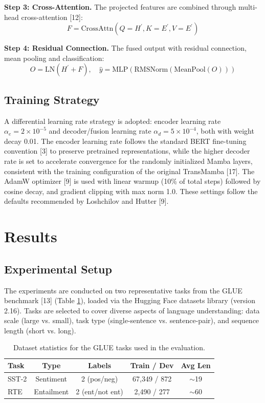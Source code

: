 \documentclass[runningheads]{llncs}
\begin{document}
\noindent\textbf{Step 3: Cross-Attention.} The projected features are combined through multi-head cross-attention [12]:
\begin{equation}
F = \text{CrossAttn}(Q = H^{\prime}, K = E^{\prime}, V = E^{\prime})
\end{equation}

\noindent\textbf{Step 4: Residual Connection.} The fused output with residual connection, mean pooling and classification:
\begin{equation}
O=\text{LN}(H^{\prime}+F), \quad \hat{y}=\text{MLP}(\text{RMSNorm}(\text{MeanPool}(O)))
\end{equation}

\subsection{Training Strategy}
A differential learning rate strategy is adopted: encoder learning rate $\alpha_{e}=2\times10^{-5}$ and decoder/fusion learning rate $\alpha_{d}=5\times10^{-4}$, both with weight decay 0.01. The encoder learning rate follows the standard BERT fine-tuning convention [3] to preserve pretrained representations, while the higher decoder rate is set to accelerate convergence for the randomly initialized Mamba layers, consistent with the training configuration of the original TransMamba [17]. The AdamW optimizer [9] is used with linear warmup (10\% of total steps) followed by cosine decay, and gradient clipping with max norm 1.0. These settings follow the defaults recommended by Loshchilov and Hutter [9].

\section{Results}

\subsection{Experimental Setup}
The experiments are conducted on two representative tasks from the GLUE benchmark [13] (Table \ref{tab:dataset}), loaded via the Hugging Face datasets library (version 2.16). Tasks are selected to cover diverse aspects of language understanding: data scale (large vs. small), task type (single-sentence vs. sentence-pair), and sequence length (short vs. long).

\begin{table}[h]
\centering
\caption{Dataset statistics for the GLUE tasks used in the evaluation.}
\label{tab:dataset}
\begin{tabular}{lcccc}
\toprule
\textbf{Task} & \textbf{Type} & \textbf{Labels} & \textbf{Train / Dev} & \textbf{Avg Len} \\
\midrule
SST-2 & Sentiment & 2 (pos/neg) & 67,349 / 872 & $\sim$19 \\
RTE & Entailment & 2 (ent/not ent) & 2,490 / 277 & $\sim$60 \\
\bottomrule
\end{tabular}
\end{table}
\end{document}
